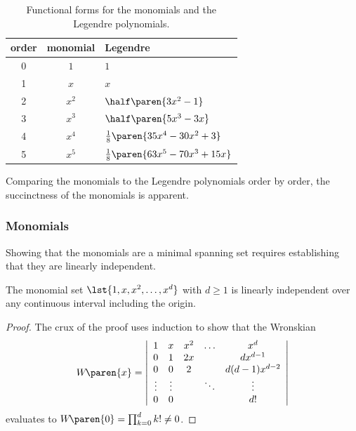 \documentclass[conference]{worldcomp}
\begin{document}
\begin{table}[htbp]
  \caption{Functional forms for the monomials and the Legendre polynomials.}
  \begin{center}
    \begin{tabular}{ccl}
      order & monomial & Legendre \\\hline
        0 & $1$ & $1$ \\
        1 & $x$ & $x$ \\
        2 & $x^{2}$ & $\half \paren{3x^{2} - 1}$ \\[4pt]
        3 & $x^{3}$ & $\half \paren{5x^{3} - 3x}$ \\[4pt]
        4 & $x^{4}$ & $\frac{1}{8} \paren{35x^{4} - 30x^{2} + 3}$ \\[4pt]
        5 & $x^{5}$ & $\frac{1}{8} \paren{63x^{5} - 70x^{3} + 15x}$ 
    \end{tabular}
  \end{center}
  \label{tab:compare}
\end{table}%
Comparing the monomials to the Legendre polynomials order by order, the succinctness of the monomials is apparent.

\subsubsection{Monomials}
Showing that the monomials are a minimal spanning set requires establishing that they are linearly independent.

\begin{theorem}
The monomial set $\lst{1, x, x^{2}, \dots, x^{d}}$ with $d \ge 1$ is linearly independent over any continuous interval including the origin.
\end{theorem}
%
\begin{proof}
The crux of the proof uses induction to show that the Wronskian
  \begin{equation}
    W\!\paren{x} = 
    \left|
      \begin{array}{ccccc}
        1 & x & x^{2} & \dots   & x^{d}    \\
        0 & 1 & 2x    &         & dx^{d-1} \\
        0 & 0 & 2 && d(d-1)x^{d-2} \\
        \vdots & \vdots  &   & \ddots & \vdots    \\
        0 & 0 &       &         & d!
     \end{array}
     \right|    
  \end{equation}
evaluates to $W\!\paren{0} = \prod_{k=0}^{d}k! \ne 0$.
\end{proof}
%
\end{document}
